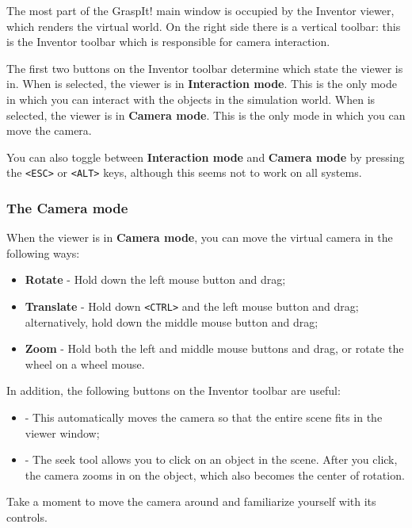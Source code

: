 The most part of the GraspIt! main window is occupied by the Inventor
viewer, which renders the virtual world. On the right side there is a
vertical toolbar: this is the Inventor toolbar which is responsible
for camera interaction.

The first two buttons on the Inventor toolbar determine which state
the viewer is in. When  is selected, the viewer
is in \textbf{Interaction mode}. This is the only mode in which you
can interact with the objects in the simulation world. When
 is selected, the viewer is in \textbf{Camera
  mode}. This is the only mode in which you can move the camera.

You can also toggle between \textbf{Interaction mode} and
\textbf{Camera mode} by pressing the \texttt{<ESC>} or \texttt{<ALT>}
keys, although this seems not to work on all systems.

\subsubsection{The Camera mode}

When the viewer is in \textbf{Camera mode}, you can move the virtual
camera in the following ways:
\begin{itemize}
\item \textbf{Rotate} - Hold down the left mouse button and drag;
\item \textbf{Translate} - Hold down \texttt{<CTRL>} and the left
  mouse button and drag; alternatively, hold down the middle mouse
  button and drag;
  \item \textbf{Zoom} - Hold both the left and middle mouse buttons
    and drag, or rotate the wheel on a wheel mouse.
\end{itemize}

In addition, the following buttons on the Inventor toolbar are useful:
\begin{itemize}
\item {} - This automatically moves the camera so
  that the entire scene fits in the viewer window;
\item {} - The seek tool allows you to click on an
  object in the scene. After you click, the camera zooms in on the
  object, which also becomes the center of rotation.
\end{itemize}

Take a moment to move the camera around and familiarize yourself with
its controls.

